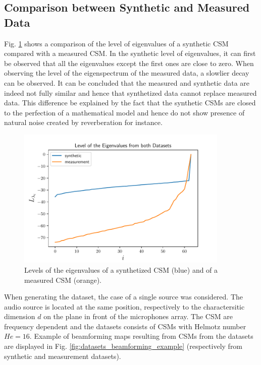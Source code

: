 \documentclass[11pt,a4paper,twoside]{report}
\begin{document}
\subsection{Comparison between Synthetic and Measured Data}

Fig. \ref{fig:comparison_synthetic_measurement_data} shows a comparison of the level of eigenvalues of a synthetic CSM compared with a measured CSM. In the synthetic level of eigenvalues, it can first be observed that all the eigenvalues except the first ones are close to zero. When observing the level of the eigenspectrum of the measured data, a slowlier decay can be observed. It can be concluded that the measured and synthetic data are indeed not fully similar and hence that synthetized data cannot replace measured data. This difference be explained by the fact that the synthetic CSMs are closed to the perfection of a mathematical model and hence do not show presence of natural noise created by reverberation for instance.

\begin{figure}
    \centering
    \includegraphics[width=0.9\textwidth]{figs/comparison_synthetic_measurement_data.pdf}
    \caption{Levels of the eigenvalues of a synthetized CSM (blue) and of a measured CSM (orange).}
    \label{fig:comparison_synthetic_measurement_data}    
\end{figure}

When generating the dataset, the case of a single source was considered. The audio source is located at the same position, respectively to the charactersitic dimension $d$ on the plane in front of the microphones array. The CSM are frequency dependent and the datasets consists of CSMs with Helmotz number $He = 16$. Example of beamforming maps resulting from CSMs from the datasets are displayed in Fig. \ref{fig:datasets_beamforming_example} (respectively from synthetic and measurement datasets).
\end{document}
